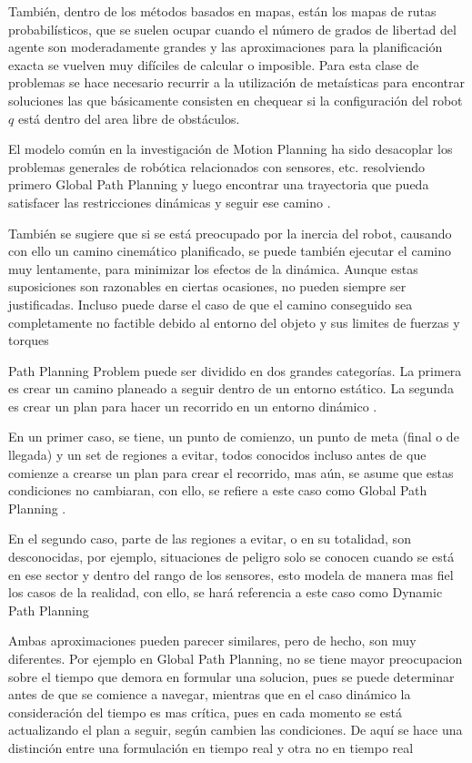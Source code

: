 Tambi\'en, dentro de los m\'etodos basados en mapas, est\'an los mapas de rutas probabil\'isticos,  que se suelen ocupar cuando el n\'umero de grados de libertad del agente son moderadamente grandes y las aproximaciones para la planificaci\'on exacta se vuelven muy dif\'iciles de calcular o imposible.  Para esta clase de problemas se hace necesario recurrir a la utilizaci\'on de meta\'isticas para encontrar soluciones las que b\'asicamente consisten en chequear si la configuraci\'on del robot $q$ est\'a dentro del area libre de obst\'aculos.


El modelo com\'un en la investigaci\'on de Motion Planning ha sido desacoplar los problemas generales de rob\'otica relacionados con sensores, etc. resolviendo primero Global Path Planning y luego encontrar una trayectoria que pueda satisfacer las restricciones din\'amicas y seguir ese camino \cite{LaValle99}.


Tambi\'en se sugiere que si se est\'a preocupado por la inercia del robot, causando con ello un camino cinem\'atico planificado, se puede tambi\'en ejecutar el camino muy lentamente, para minimizar los efectos de la din\'amica. Aunque estas suposiciones son razonables en ciertas ocasiones, no pueden siempre ser justificadas. Incluso puede darse el caso de que el camino conseguido sea completamente no factible debido al entorno del objeto y sus limites de fuerzas y torques \cite{LaValle99}

Path Planning Problem puede ser dividido en dos grandes categor\'ias. La primera es crear un camino planeado a seguir dentro de un entorno est\'atico. La segunda es crear un plan para hacer un recorrido en un entorno din\'amico \cite{Goldman94}.

En un primer caso, se tiene, un punto de comienzo, un punto de meta (final o de llegada) y un set de regiones a evitar, todos conocidos incluso antes de que comienze a crearse un plan para crear el recorrido, mas a\'un, se asume que estas condiciones no cambiaran, con ello, se refiere a este caso como Global Path Planning \cite{Goldman94}.

En el segundo caso, parte de las regiones a evitar, o en su totalidad, son desconocidas, por ejemplo, situaciones de peligro solo se conocen cuando se est\'a en ese sector y dentro del rango de los sensores, esto modela de manera mas fiel los casos de la realidad, con ello, se har\'a referencia a este caso como Dynamic Path Planning

Ambas aproximaciones pueden parecer similares, pero de hecho, son muy diferentes. Por ejemplo en Global Path Planning, no se tiene mayor preocupacion sobre el tiempo que demora en formular una solucion, pues se puede determinar antes de que se comience a navegar, mientras que en el caso din\'amico la consideraci\'on del tiempo es mas cr\'itica, pues en cada momento se est\'a actualizando el plan a seguir, seg\'un cambien las condiciones. De aqu\'i se hace una distinci\'on entre una formulaci\'on en tiempo real y otra no en tiempo real \cite{Goldman94}

